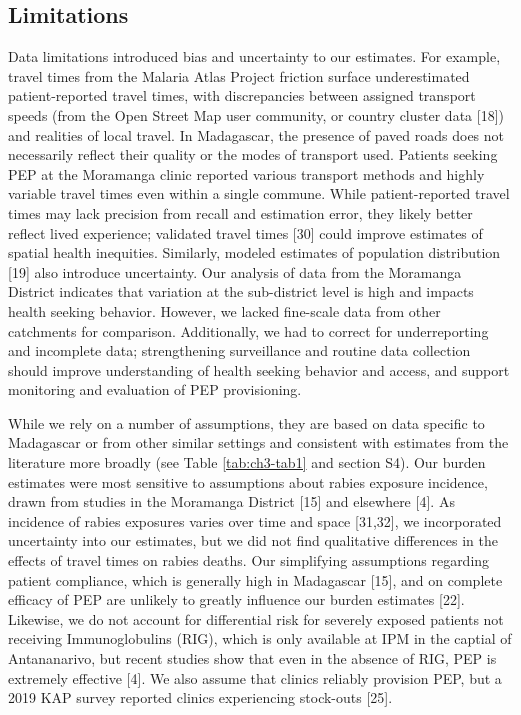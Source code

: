 \documentclass[
  oneside]{book}
\begin{document}
\hypertarget{limitations}{%
\subsection{Limitations}\label{limitations}}

Data limitations introduced bias and uncertainty to our estimates. For
example, travel times from the Malaria Atlas Project friction surface
underestimated patient-reported travel times, with discrepancies between
assigned transport speeds (from the Open Street Map user community, or
country cluster data {[}18{]}) and realities of local travel. In
Madagascar, the presence of paved roads does not necessarily reflect
their quality or the modes of transport used. Patients seeking PEP at
the Moramanga clinic reported various transport methods and highly
variable travel times even within a single commune. While
patient-reported travel times may lack precision from recall and
estimation error, they likely better reflect lived experience; validated
travel times {[}30{]} could improve estimates of spatial health
inequities. Similarly, modeled estimates of population distribution
{[}19{]} also introduce uncertainty. Our analysis of data from the
Moramanga District indicates that variation at the sub-district level is
high and impacts health seeking behavior. However, we lacked fine-scale
data from other catchments for comparison. Additionally, we had to
correct for underreporting and incomplete data; strengthening
surveillance and routine data collection should improve understanding of
health seeking behavior and access, and support monitoring and
evaluation of PEP provisioning.

While we rely on a number of assumptions, they are based on data
specific to Madagascar or from other similar settings and consistent
with estimates from the literature more broadly (see Table \ref{tab:ch3-tab1} and section
S4). Our burden estimates were most sensitive to assumptions about
rabies exposure incidence, drawn from studies in the Moramanga District
{[}15{]} and elsewhere {[}4{]}. As incidence of rabies exposures varies over
time and space {[}31,32{]}, we incorporated uncertainty into our
estimates, but we did not find qualitative differences in the effects of
travel times on rabies deaths. Our simplifying assumptions regarding
patient compliance, which is generally high in Madagascar {[}15{]}, and on
complete efficacy of PEP are unlikely to greatly influence our burden
estimates {[}22{]}. Likewise, we do not account for differential risk for
severely exposed patients not receiving Immunoglobulins (RIG), which is
only available at IPM in the captial of Antananarivo, but recent studies
show that even in the absence of RIG, PEP is extremely effective {[}4{]}.
We also assume that clinics reliably provision PEP, but a 2019 KAP
survey reported clinics experiencing stock-outs {[}25{]}.
\end{document}
